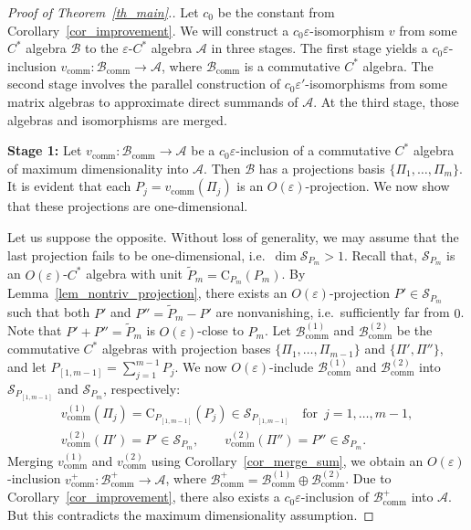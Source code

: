 \documentclass[12pt]{article}
\newcommand{\calA}{\mathcal{A}}
\newcommand{\calB}{\mathcal{B}}
\newcommand{\calS}{\mathcal{S}}
\newcommand{\comm}{\mathrm{comm}}
\newcommand{\Co}{\mathrm{C}}
\newcommand{\wt}{\widetilde}
\newcommand{\eps}{\varepsilon}
\newtheorem[definition]{Definition}[Theorem]{Definition}
\newtheorem[remark]{Example}[Theorem]{Example}
\newtheorem[remark]{Remark}[Theorem]{Remark}
\newtheorem[remark]{Question}[Theorem]{Open question}
\newtheorem*[definition]{definition}{Definition}
\newtheorem*[remark]{example}{Example}
\newtheorem*[remark]{remark}{Remark}
\newtheorem*[remark]{question}{Open question}
\numberwithin{equation}{section}
\begin{document}
\begin{proof}[Proof of Theorem~\ref{th_main}.]
Let $c_0$ be the constant from Corollary~\ref{cor_improvement}. We will construct a $c_0\eps$-isomorphism $v$ from some $C^*$ algebra $\calB$ to the $\eps$-$C^*$ algebra $\calA$ in three stages. The first stage yields a $c_0\eps$-inclusion $v_\comm\colon\calB_\comm\to\calA$, where $\calB_\comm$ is a commutative $C^*$ algebra. The second stage involves the parallel construction of $c_0\eps'$-isomorphisms from some matrix algebras to approximate direct summands of $\calA$. At the third stage, those algebras and isomorphisms are merged.\medskip

\noindent\textbf{Stage 1:} Let $v_\comm\colon\calB_\comm\to\calA$ be a $c_0\eps$-inclusion of a commutative $C^*$ algebra of maximum dimensionality into $\calA$. Then $\calB$ has a projections basis $\{\Pi_1,\dots,\Pi_m\}$. It is evident that each $P_j=v_\comm(\Pi_j)$ is an $O(\eps)$-projection. We now show that these projections are one-dimensional.

Let us suppose the opposite. Without loss of generality, we may assume that the last   projection fails to be one-dimensional, i.e.\ $\dim\calS_{P_m}>1$. Recall that, $\calS_{P_m}$ is an $O(\eps)$-$C^*$ algebra with unit $\wt{P}_m=\Co_{P_m}(P_m)$. By Lemma~\ref{lem_nontriv_projection}, there exists an $O(\eps)$-projection $P'\in\calS_{P_m}$ such that both $P'$ and $P''=\wt{P}_m-P'$ are nonvanishing, i.e.\ sufficiently far from $0$. Note that $P'+P''=\wt{P}_m$ is $O(\eps)$-close to $P_m$. Let $\calB_\comm^{(1)}$ and $\calB_\comm^{(2)}$ be the commutative $C^*$ algebras with projection bases $\{\Pi_1,\dots,\Pi_{m-1}\}$ and $\{\Pi',\Pi''\}$, and let $P_{[1,m-1]}=\sum_{j=1}^{m-1}P_j$. We now $O(\eps)$-include $\calB_\comm^{(1)}$ and $\calB_\comm^{(2)}$ into $\calS_{P_{[1,m-1]}}$ and $\calS_{P_m}$, respectively:
\begin{gather*}
v_\comm^{(1)}(\Pi_j)=\Co_{P_{[1,m-1]}}(P_j)\in\calS_{P_{[1,m-1]}}\quad
\text{for }\, j=1,\dots,m-1,\\[2pt]
v_\comm^{(2)}(\Pi')=P'\in\calS_{P_m},\qquad
v_\comm^{(2)}(\Pi'')=P''\in\calS_{P_m}.
\end{gather*}
Merging $v_\comm^{(1)}$ and $v_\comm^{(2)}$ using Corollary~\ref{cor_merge_sum}, we obtain an $O(\eps)$-inclusion $v_\comm^+\colon\calB_\comm^+\to\calA$, where $\calB_\comm^+=\calB_\comm^{(1)}\oplus\calB_\comm^{(2)}$. Due to Corollary~\ref{cor_improvement}, there also exists a $c_0\eps$-inclusion of $\calB_\comm^+$ into $\calA$. But this contradicts the maximum dimensionality assumption.\medskip


\end{proof}
\end{document}
